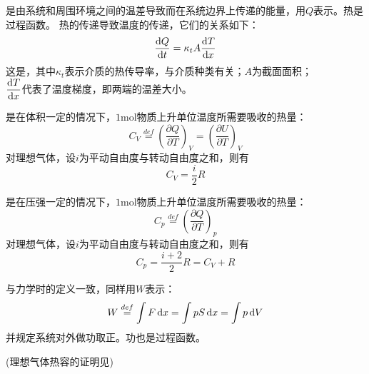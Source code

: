             \begin{Itemize}
                \item {}是由系统和周围环境之间的温差导致而在系统边界上传递的能量，用$Q$表示。热是过程函数。
                热的传递导致温度的传递，它们的关系如下：
                \begin{equation}
                    \frac{\dif{Q}}{\dif{t}} = \kappa_{t}A\frac{\dif{T}}{\dif{x}}
                \end{equation}
                这是，其中$\kappa_{t}$表示介质的热传导率，与介质种类有关；$A$为截面面积；\\[1ex]
                $\dfrac{\dif{T}}{\dif{x}}$代表了温度梯度，即两端的温差大小。
                \item {}是在体积一定的情况下，$1\mathrm{mol}$物质上升单位温度所需要吸收的热量：
                \begin{equation}
                    C_{V} \overset{def}{=} \left(\frac{\partial{Q}}{\partial{T}}\right)_{V} = \left(\frac{\partial{U}}{\partial{T}}\right)_{V}
                    \nonumber
                \end{equation}
                对理想气体，设$i$为平动自由度与转动自由度之和，则有
                \begin{equation}
                    C_{V} = \frac{i}{2}R
                    \nonumber
                \end{equation}
                \item {}是在压强一定的情况下，$1\mathrm{mol}$物质上升单位温度所需要吸收的热量：
                \begin{equation}
                    C_{p} \overset{def}{=} \left(\frac{\partial{Q}}{\partial{T}}\right)_{p} 
                    \nonumber
                \end{equation}
                对理想气体，设$i$为平动自由度与转动自由度之和，则有
                \begin{equation}
                    C_{p} = \frac{i+2}{2}R = C_{V}+R
                    \nonumber
                \end{equation}
                \item {}与力学时的定义一致，同样用$W$表示：
                \begin{equation}
                    W \overset{def}{=} \int F\dif{x} = \int pS\dif{x} = \int p\dif{V}
                    \nonumber
                \end{equation}
                并规定系统对外做功取正。功也是过程函数。                
            \end{Itemize}
            (理想气体热容的证明见)

